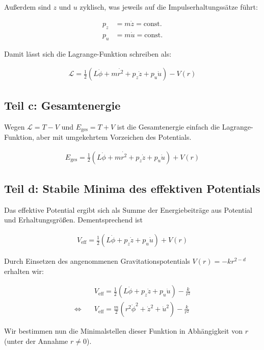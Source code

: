 \documentclass[a4paper,german,12pt,smallheadings]{scrartcl}
\begin{document}
Außerdem sind $z$ und $u$ zyklisch, was jeweils auf die Impulserhaltungssätze führt:

\begin{align*}
  p_z &= m\dot{z} = \text{const.} \\
  p_u &= m\dot{u} = \text{const.}
\end{align*}

Damit lässt sich die Lagrange-Funktion schreiben als:

\begin{align*}
  \mathcal{L} = \frac{1}{2}(L\dot{\phi} + m\dot{r^2} + p_z\dot{z} + p_u \dot{u}) - V(r)
\end{align*}

\subsection*{Teil c: Gesamtenergie}

Wegen $\mathcal{L} = T - V$ und $E_{\text{ges}} = T + V$ ist die Gesamtenergie
einfach die Lagrange-Funktion, aber mit umgekehrtem Vorzeichen des Potentials.

\begin{align*}
  E_{\text{ges}} = \frac{1}{2}(L\dot{\phi} + m\dot{r^2} + p_z\dot{z} + p_u \dot{u}) + V(r)
\end{align*}

\subsection*{Teil d: Stabile Minima des effektiven Potentials}
Das effektive Potential ergibt sich als Summe der Energiebeiträge aus Potential
und Erhaltungsgrößen. Dementsprechend ist

\begin{align*}
  V_{\text{eff}} = \frac{1}{2}(L\dot{\phi} + p_z\dot{z} + p_u \dot{u}) + V(r)
\end{align*}

Durch Einsetzen des angenommenen Gravitationspotentials $V(r) = -kr^{2-d}$
erhalten wir:

\begin{align*}
  &V_{\text{eff}} = \frac{1}{2}(L\dot{\phi} + p_z\dot{z} + p_u \dot{u}) - \frac{k}{r^2} \\
  \Leftrightarrow\quad&V_{\text{eff}} = \frac{m}{2}(r^2\dot{\phi}^2 + \dot{z}^2 + \dot{u}^2) - \frac{k}{r^2}
\end{align*}

Wir bestimmen nun die Minimalstellen dieser Funktion in Abhängigkeit von $r$
(unter der Annahme $r \neq 0$).
\end{document}
